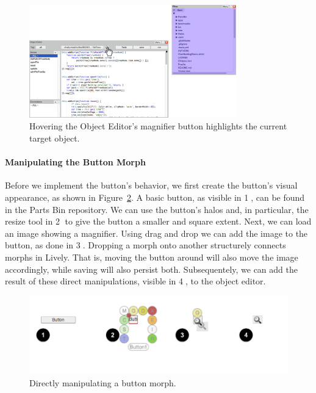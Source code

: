 \begin{figure}[h]
    \centering
    \includegraphics[width=0.8\textwidth]{figures/3_motivation/2_magnifierBehavior.png}
    \caption{Hovering the Object Editor's magnifier button highlights the current target object.}
    \label{fig:MagnifierBehavior}
\end{figure}

\paragraph{Manipulating the Button Morph}
Before we implement the button's behavior, we first create the button's visual appearance, as shown in Figure~\ref{fig:ButtonBuilding}.
A basic button, as visible in \textcircled{1}, can be found in the Parts Bin repository.
We can use the button's halos and, in particular, the resize tool in \textcircled{2} to give the button a smaller and square extent.
Next, we can load an image showing a magnifier.
Using drag and drop we can add the image to the button, as done in \textcircled{3}.
Dropping a morph onto another structurely connects morphs in Lively.
That is, moving the button around will also move the image accordingly, while saving will also persist both.
Subsequentely, we can add the result of these direct manipulations, visible in \textcircled{4}, to the object editor.

\begin{figure}[h]
    \centering
    \includegraphics[width=\textwidth]{figures/3_motivation/3_buildingTheButton.png}
    \caption{Directly manipulating a button morph.}
    \label{fig:ButtonBuilding}
\end{figure}

